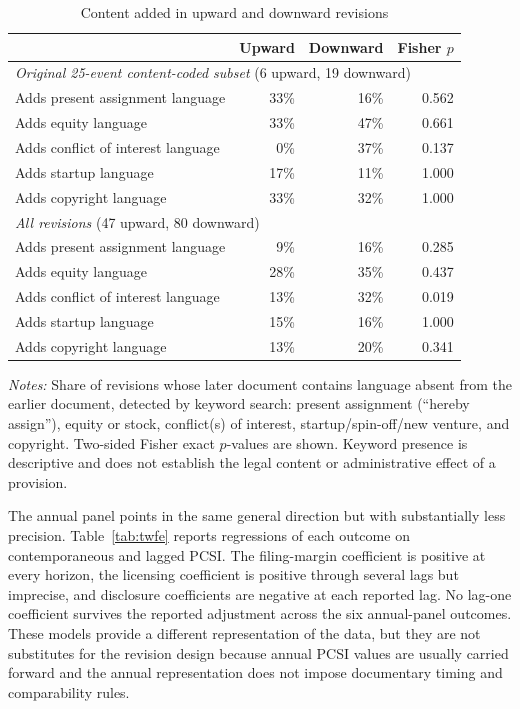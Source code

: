 \begin{table}[htbp]\centering
\caption{Content added in upward and downward revisions}\label{tab:content}
\begin{threeparttable}\small\begin{tabular}{lrrr}\toprule
 & Upward & Downward & Fisher $p$ \\\midrule
\multicolumn{4}{l}{\textit{Original 25-event content-coded subset} (6 upward, 19 downward)} \\
\quad Adds present assignment language & 33\% & 16\% & 0.562 \\
\quad Adds equity language & 33\% & 47\% & 0.661 \\
\quad Adds conflict of interest language & 0\% & 37\% & 0.137 \\
\quad Adds startup language & 17\% & 11\% & 1.000 \\
\quad Adds copyright language & 33\% & 32\% & 1.000 \\
\multicolumn{4}{l}{\textit{All revisions} (47 upward, 80 downward)} \\
\quad Adds present assignment language & 9\% & 16\% & 0.285 \\
\quad Adds equity language & 28\% & 35\% & 0.437 \\
\quad Adds conflict of interest language & 13\% & 32\% & 0.019 \\
\quad Adds startup language & 15\% & 16\% & 1.000 \\
\quad Adds copyright language & 13\% & 20\% & 0.341 \\
\bottomrule\end{tabular}
\begin{tablenotes}[flushleft]\footnotesize
\item \textit{Notes:} Share of revisions whose later document contains language absent from the earlier document, detected by keyword search: present assignment (``hereby assign''), equity or stock, conflict(s) of interest, startup/spin-off/new venture, and copyright. Two-sided Fisher exact $p$-values are shown. Keyword presence is descriptive and does not establish the legal content or administrative effect of a provision.
\end{tablenotes}\end{threeparttable}\end{table}

The annual panel points in the same general direction but with substantially less precision. Table~\ref{tab:twfe} reports regressions of each outcome on contemporaneous and lagged PCSI. The filing-margin coefficient is positive at every horizon, the licensing coefficient is positive through several lags but imprecise, and disclosure coefficients are negative at each reported lag. No lag-one coefficient survives the reported adjustment across the six annual-panel outcomes. These models provide a different representation of the data, but they are not substitutes for the revision design because annual PCSI values are usually carried forward and the annual representation does not impose documentary timing and comparability rules.

